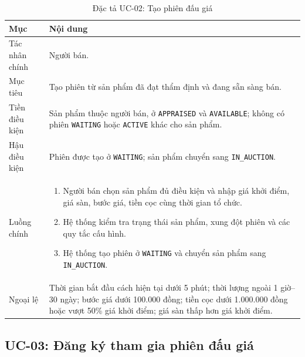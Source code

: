 \documentclass[../DoAn.tex]{subfiles}
\begin{document}
\begin{table}[H]
    \centering
    \caption{Đặc tả UC-02: Tạo phiên đấu giá}
    \label{tab:uc-create-auction}
    \footnotesize
    \setlength{\tabcolsep}{4pt}
    \renewcommand{\arraystretch}{1.03}
    \begin{tabular}{|>{\raggedright\arraybackslash}p{}|>{\raggedright\arraybackslash}p{}|}
        \hline
        \textbf{Mục} & \textbf{Nội dung} \\
        \hline
        Tác nhân chính & Người bán. \\
        \hline
        Mục tiêu & Tạo phiên từ sản phẩm đã đạt thẩm định và đang sẵn sàng bán. \\
        \hline
        Tiền điều kiện & Sản phẩm thuộc người bán, ở \texttt{APPRAISED} và \texttt{AVAILABLE}; không có phiên \texttt{WAITING} hoặc \texttt{ACTIVE} khác cho sản phẩm. \\
        \hline
        Hậu điều kiện & Phiên được tạo ở \texttt{WAITING}; sản phẩm chuyển sang \texttt{IN\_AUCTION}. \\
        \hline
        Luồng chính &
        \begin{enumerate}[label=\roman*., leftmargin=*, nosep]
            \item Người bán chọn sản phẩm đủ điều kiện và nhập giá khởi điểm, giá sàn, bước giá, tiền cọc cùng thời gian tổ chức.
            \item Hệ thống kiểm tra trạng thái sản phẩm, xung đột phiên và các quy tắc cấu hình.
            \item Hệ thống tạo phiên ở \texttt{WAITING} và chuyển sản phẩm sang \texttt{IN\_AUCTION}.
        \end{enumerate} \\
        \hline
        Ngoại lệ & Thời gian bắt đầu cách hiện tại dưới 5 phút; thời lượng ngoài 1 giờ--30 ngày; bước giá dưới 100.000 đồng; tiền cọc dưới 1.000.000 đồng hoặc vượt 50\% giá khởi điểm; giá sàn thấp hơn giá khởi điểm. \\
        \hline
    \end{tabular}
\end{table}
\FloatBarrier

\subsection{UC-03: Đăng ký tham gia phiên đấu giá}
\end{document}
